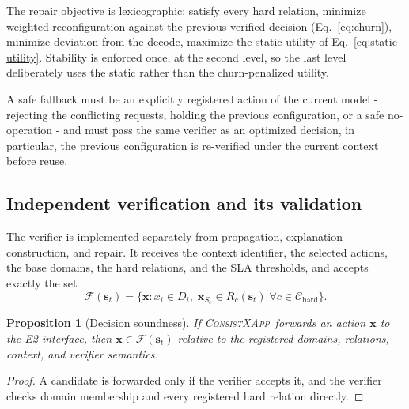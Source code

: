 \documentclass[pdflatex,sn-mathphys-num,iicol,oneside]{sn-jnl}
\newcommand{\method}{\textsc{ConsistXApp}}
\newtheorem{proposition}{Proposition}
\begin{document}
The repair objective is lexicographic: satisfy every hard relation,
minimize weighted reconfiguration against the previous verified
decision (Eq.~\eqref{eq:churn}), minimize deviation from the decode,
maximize the static utility of Eq.~\eqref{eq:static-utility}.
Stability is enforced once, at the second level, so the last level
deliberately uses the static rather than the churn-penalized utility.

A safe fallback must be an explicitly registered action of the current
model - rejecting the conflicting requests, holding the previous
configuration, or a safe no-operation - and must pass the same
verifier as an optimized decision, in particular, the previous
configuration is re-verified under the current context before reuse.

\subsection{Independent verification and its validation}
\label{sec:verifier}

The verifier is implemented separately from propagation, explanation
construction, and repair. It receives the context identifier, the
selected actions, the base domains, the hard relations, and the SLA
thresholds, and accepts exactly the set
\begin{equation}
\mathcal{F}(\bm{s}_t)=
\{\bm{x}: x_i\in D_i,\;
\bm{x}_{S_c}\in R_c(\bm{s}_t)\;\forall c\in\mathcal{C}_{\mathrm{hard}}\}.
\label{eq:feasible-set}
\end{equation}

\begin{proposition}[Decision soundness]
\label{prop:soundness}
If \method\ forwards an action $\bm{x}$ to the E2 interface, then
$\bm{x}\in\mathcal{F}(\bm{s}_t)$ relative to the registered domains,
relations, context, and verifier semantics.
\end{proposition}

\begin{proof}
A candidate is forwarded only if the verifier accepts it, and the
verifier checks domain membership and every registered hard relation
directly.
\end{proof}
\end{document}
